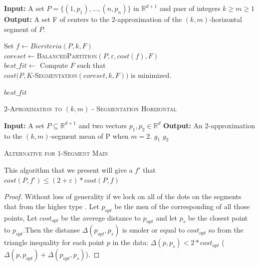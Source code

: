 \documentclass{vldb}
\begin{document}
\begin{algorithm}
\begin{algorithmic}
\STATE \textbf{Input:} A set $P = \lbrace(1,p_1),...,(n,p_n)\rbrace$ in $ \mathbb{R}^{d+1}$
and paer of integers $k\geq m\geq1$
\STATE \textbf{Output:} A set F of centers to the  $2$-approximation of the $(k,m)$-horizontal segment of $P$.
 

\STATE 
Set $f \gets Bicriteria(P,k,F)$ \\
$coreset \gets $\textsc{BalancedPartition}$(P,\varepsilon,cost(f),F)$\\
\STATE $best\_fit \gets $ Compute $F$ such that \\$cost(P,$\textsc{$K$-Segmentation$(coreset,k,F)$}$)$ is minimized.

\ENDFOR

\RETURN $best\_fit$



\caption{\textsc{$2$-Aproximation to $(k,m)$ - Segmentation Horizontal}}

\end{algorithmic}
\end{algorithm}
\begin{algorithm}
\begin{algorithmic}
\STATE \textbf{Input:} A set $P\subseteq \mathbb{R}^{d+1}$
and two vectors $p_1,p_2 \in \mathbb{R}^d$
\STATE \textbf{Output:} An $2$-approximation to the $(k,m)$-segment mean of P when $m=2$.
\RETURN $g_1$
\ELSE
\RETURN $g_2$
\ENDIF 

\caption{\textsc{Alternative for $1$-Segment Main}}

\end{algorithmic}
\end{algorithm}
\newtheorem{A}{Theorem}
\begin{theorem}
This algorithm that we present will give a $f'$ that 
$cost(P,f')\leq (2+\varepsilon)*cost(P,f)$
\\


\end{theorem}
\begin{proof}
Without loss of generality
if we lock on all of the dots on the segments that from the higher type .
Let $p_{opt}$ be the men of the corresponding of all those points, Let $cost_{opt}$ be the averege distance to $p_{opt}$ and let $p_{s}$ be the closest point to $p_{opt}$.Then the distanse $\Delta(p_{opt},p_s)$ is smoler or equal to $cost_{opt}$ so from the triangle inequality for each point $p$ in the data: $\Delta(p,p_s)<2*cost_{opt}$ ($\Delta(p,p_{opt})+\Delta(p_{opt},p_s)$).

\end{proof}
\end{document}

